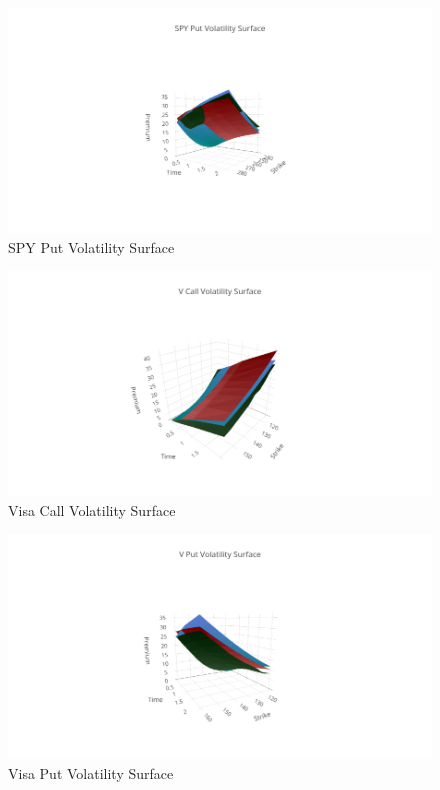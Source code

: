 \documentclass{article}
\begin{document}
\begin{figure}[h!]
\includegraphics[width =\textwidth]{images/VolSurface/SPYPut.png}
\caption{SPY Put Volatility Surface}
\centering
\end{figure}
\begin{figure}[h!]
\includegraphics[width =\textwidth]{images/VolSurface/VCall.png}
\caption{Visa Call Volatility Surface}
\centering
\end{figure}
\begin{figure}[h!]
\includegraphics[width =\textwidth]{images/VolSurface/VPut.png}
\caption{Visa Put Volatility Surface}
\centering
\end{figure}
\end{document}
